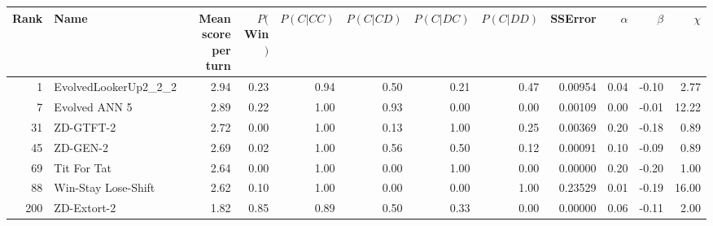 \begin{tabular}{rlrrrrrrrrrr}
\toprule
 Rank &                  Name &  Mean score per turn &  $P($Win$)$ &  $P(C|CC)$ &  $P(C|CD)$ &  $P(C|DC)$ &  $P(C|DD)$ &  SSError &  $\alpha$ &  $\beta$ &  $\chi$ \\
\midrule
    1 &  EvolvedLookerUp2\_2\_2 &                 2.94 &        0.23 &       0.94 &       0.50 &       0.21 &       0.47 &  0.00954 &      0.04 &    -0.10 &    2.77 \\
    7 &         Evolved ANN 5 &                 2.89 &        0.22 &       1.00 &       0.93 &       0.00 &       0.00 &  0.00109 &      0.00 &    -0.01 &   12.22 \\
   31 &             ZD-GTFT-2 &                 2.72 &        0.00 &       1.00 &       0.13 &       1.00 &       0.25 &  0.00369 &      0.20 &    -0.18 &    0.89 \\
   45 &              ZD-GEN-2 &                 2.69 &        0.02 &       1.00 &       0.56 &       0.50 &       0.12 &  0.00091 &      0.10 &    -0.09 &    0.89 \\
   69 &           Tit For Tat &                 2.64 &        0.00 &       1.00 &       0.00 &       1.00 &       0.00 &  0.00000 &      0.20 &    -0.20 &    1.00 \\
   88 &   Win-Stay Lose-Shift &                 2.62 &        0.10 &       1.00 &       0.00 &       0.00 &       1.00 &  0.23529 &      0.01 &    -0.19 &   16.00 \\
  200 &           ZD-Extort-2 &                 1.82 &        0.85 &       0.89 &       0.50 &       0.33 &       0.00 &  0.00000 &      0.06 &    -0.11 &    2.00 \\
\bottomrule
\end{tabular}
